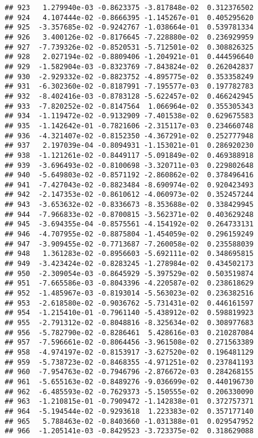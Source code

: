 \documentclass[
]{article}
\begin{document}
\begin{verbatim}
## 923   1.279940e-03 -0.8623375 -3.817848e-02  0.312376502
## 924   4.107444e-02 -0.8666395 -1.145267e-01  0.405295620
## 925  -3.357685e-02 -0.9242767 -1.038664e-01  0.539781334
## 926   3.400126e-02 -0.8176645 -7.228880e-02  0.236929959
## 927  -7.739326e-02 -0.8520531 -5.712501e-02  0.308826325
## 928   2.027194e-02 -0.8809406 -1.204921e-01  0.444596640
## 929  -1.582904e-03 -0.8323769 -7.843824e-02  0.262042837
## 930  -2.929332e-02 -0.8823752 -4.895775e-02  0.353358249
## 931  -6.302360e-02 -0.8187991 -7.195577e-03  0.197782783
## 932  -8.402416e-03 -0.8783128 -5.622457e-02  0.466242945
## 933  -7.820252e-02 -0.8147564  1.066964e-02  0.355305343
## 934  -1.119472e-02 -0.9132909 -7.401538e-02  0.629675583
## 935  -1.142642e-01 -0.7821606 -2.315117e-03  0.234660748
## 936  -4.321407e-02 -0.8152350 -4.367291e-02  0.252777948
## 937   2.197039e-04 -0.8094931 -1.153021e-01  0.286920230
## 938  -1.121261e-02 -0.8449117 -5.091849e-02  0.469388918
## 939  -3.696493e-02 -0.8100698 -3.320711e-03  0.229802648
## 940  -5.649803e-02 -0.8571192 -2.860862e-02  0.378496416
## 941  -7.427043e-02 -0.8823484 -8.690974e-02  0.920423493
## 942  -2.147353e-02 -0.8610612 -4.060973e-02  0.352457244
## 943  -3.653632e-02 -0.8336673 -8.353688e-02  0.338429945
## 944  -7.966833e-02 -0.8700815 -3.562371e-02  0.403629248
## 945  -3.694355e-04 -0.8575561 -4.154192e-02  0.264733131
## 946  -4.707955e-02 -0.8875804 -1.454059e-02  0.296159249
## 947  -3.909455e-02 -0.7713687 -7.260058e-02  0.235588039
## 948   1.361283e-02 -0.8956603 -5.692111e-02  0.348695815
## 949  -3.423424e-02 -0.8283245 -1.278984e-02  0.434502173
## 950  -2.309054e-03 -0.8645929 -5.397529e-02  0.503519874
## 951  -7.665586e-03 -0.8043396 -4.220587e-02  0.238618629
## 952  -1.485967e-03 -0.8193014 -5.563023e-02  0.236382516
## 953  -2.618580e-02 -0.9036762 -5.731431e-02  0.446161597
## 954  -1.215410e-01 -0.7961140 -5.438912e-02  0.598819923
## 955  -2.791312e-02 -0.8048816 -8.325634e-02  0.308977683
## 956  -5.782790e-02 -0.8286461  5.428616e-03  0.210287084
## 957  -7.596661e-02 -0.8064456 -3.961508e-02  0.271563389
## 958  -4.974197e-02 -0.8153917 -3.627520e-02  0.196481129
## 959  -5.738723e-02 -0.8468355 -4.971251e-02  0.237841193
## 960  -7.954763e-02 -0.7946796 -2.876672e-03  0.284268155
## 961  -5.655163e-02 -0.8489276 -9.036699e-02  0.440196730
## 962  -6.485593e-02 -0.7629373 -5.150555e-02  0.206330090
## 963  -1.210815e-01 -0.7909472 -1.142838e-01  0.372757371
## 964  -5.194544e-02 -0.9293618  1.223383e-02  0.357177140
## 965   5.788463e-02 -0.8403660 -1.031388e-01  0.029547952
## 966  -1.205141e-03 -0.8429523 -3.723375e-02  0.318629088

\end{verbatim}
\end{document}
